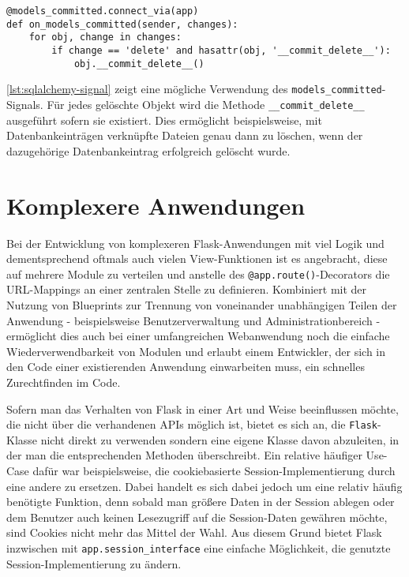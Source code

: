 \begin{lstlisting}[caption=Flask-SQLAlchemy-Signals,label=lst:sqlalchemy-signal]
@models_committed.connect_via(app)
def on_models_committed(sender, changes):
    for obj, change in changes:
        if change == 'delete' and hasattr(obj, '__commit_delete__'):
            obj.__commit_delete__()
\end{lstlisting}

\autoref{lst:sqlalchemy-signal} zeigt eine mögliche Verwendung des
\lstinline{models_committed}-Signals. Für jedes gelöschte Objekt wird die Methode
\lstinline{__commit_delete__} ausgeführt sofern sie existiert. Dies ermöglicht beispielsweise, mit
Datenbankeinträgen verknüpfte Dateien genau dann zu löschen, wenn der dazugehörige Datenbankeintrag
erfolgreich gelöscht wurde.


\section{Komplexere Anwendungen}

Bei der Entwicklung von komplexeren Flask-Anwendungen mit viel Logik und dementsprechend oftmals
auch vielen View-Funktionen ist es angebracht, diese auf mehrere Module zu verteilen und anstelle
des \lstinline{@app.route()}-Decorators die URL-Mappings an einer zentralen Stelle zu definieren.
Kombiniert mit der Nutzung von Blueprints zur Trennung von voneinander unabhängigen Teilen der
Anwendung - beispielsweise Benutzerverwaltung und Administrationbereich - ermöglicht dies auch bei
einer umfangreichen Webanwendung noch die einfache Wiederverwendbarkeit von Modulen und erlaubt
einem Entwickler, der sich in den Code einer existierenden Anwendung einwarbeiten muss, ein
schnelles Zurechtfinden im Code.

Sofern man das Verhalten von Flask in einer Art und Weise beeinflussen möchte, die nicht über die
verhandenen APIs möglich ist, bietet es sich an, die \lstinline{Flask}-Klasse nicht direkt zu
verwenden sondern eine eigene Klasse davon abzuleiten, in der man die entsprechenden Methoden
überschreibt. Ein relative häufiger Use-Case dafür war beispielsweise, die cookiebasierte
Session-Implementierung durch eine andere zu ersetzen. Dabei handelt es sich dabei jedoch um eine
relativ häufig benötigte Funktion, denn sobald man größere Daten in der Session ablegen oder dem
Benutzer auch keinen Lesezugriff auf die Session-Daten gewähren möchte, sind Cookies nicht mehr das
Mittel der Wahl. Aus diesem Grund bietet Flask inzwischen mit \lstinline{app.session_interface} eine
einfache Möglichkeit, die genutzte Session-Implementierung zu ändern.
